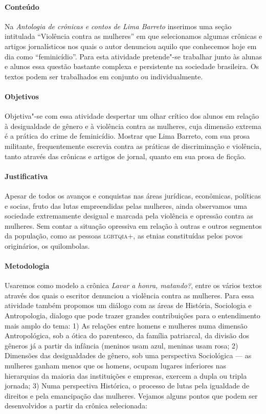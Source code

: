 \documentclass{extarticle}
\begin{document}


\paragraph{Conteúdo} Na \emph{Antologia de crônicas e contos de Lima
Barreto} inserimos uma seção intitulada ``Violência contra as mulheres''
em que selecionamos algumas crônicas e artigos jornalísticos nos quais o
autor denunciou aquilo que conhecemos hoje em dia como ``feminicídio''.
Para esta atividade pretende"-se trabalhar junto às alunas e alunos essa
questão bastante complexa e persistente na sociedade brasileira. Os
textos podem ser trabalhados em conjunto ou individualmente.

\paragraph{Objetivos} Objetiva"-se com essa atividade despertar um olhar
crítico dos alunos em relação à desigualdade de gênero e à violência
contra as mulheres, cuja dimensão extrema é a prática do crime de
feminicídio. Mostrar que Lima Barreto, com sua prosa militante,
frequentemente escrevia contra as práticas de discriminação e violência,
tanto através das crônicas e artigos de jornal, quanto em sua prosa de
ficção.

\paragraph{Justificativa} Apesar de todos os avanços e conquistas nas
áreas jurídicas, econômicas, políticas e socias, fruto das lutas
empreendidas pelas mulheres, ainda observamos uma sociedade extremamente
desigual e marcada pela violência e opressão contra as mulheres. Sem
contar a situação opressiva em relação à outras e outros segmentos da
população, como as pessoas \textsc{lgbtqia}+, as etnias constituídas pelos povos
originários, os quilombolas.

\paragraph{Metodologia} Usaremos como modelo a crônica {\textit{Lavar
a honra, matando?}}, entre os vários textos através dos quais o escritor
denunciou a violência contra as mulheres. Para essa atividade também
propomos um diálogo com as áreas de História, Sociologia e Antropologia,
dialogo que pode trazer grandes contribuições para o entendimento mais
amplo do tema: 1) As relações entre homens e mulheres numa dimensão
Antropológica, sob a ótica do parentesco, da família patriarcal, da
divisão dos gêneros já a partir da infância (meninos usam azul, meninas
usam rosa; 2) Dimensões das desigualdades de gênero, sob uma perspectiva
Sociológica --- as mulheres ganham menos que os homens, ocupam lugares
inferiores nas hierarquias da maioria das instituições e empresas,
exercem a dupla ou tripla jornada; 3) Numa perspectiva Histórica, o
processo de lutas pela igualdade de direitos e pela emancipação das
mulheres. Vejamos alguns pontos que podem ser desenvolvidos a partir da
crônica selecionada:
\end{document}
